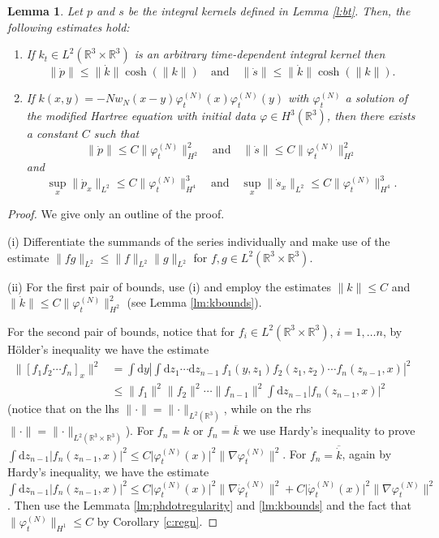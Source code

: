 \documentclass[11pt,a4paper,draft,DIV11]{scrartcl}	%
\newtheorem{lem}[thm]{Lemma}
\newcommand{\di}{\textrm{d}}		%
\newcommand{\cc}[1]{\overline{#1}}	%
\newcommand{\Rbb}{\mathbb{R}}		%
\newcommand{\norm}[1]{\lVert#1\rVert}	%
\newcommand{\ph}{\varphi_t^{(N)}}	%
\newcommand{\phdot}{\dot{\varphi}_t^{(N)}}	%
\newcommand{\bd}{\begin{displaymath}}			%
\newcommand{\ed}{\end{displaymath}}
\begin{document}
\begin{lem}
\label{lem:dottedests1}
Let $p$ and $s$ be the integral kernels defined in Lemma \ref{l:bt}. Then, the following estimates hold:
\begin{enumerate}
\item If $k_t \in L^2(\Rbb^3\times\Rbb^3)$ is an arbitrary time-dependent integral kernel then
\bd
\norm{\dot p} \leq \norm{\dot k} \cosh(\norm{k}) \quad \mbox{and} \quad \norm{\dot s} \leq \norm{\dot k} \cosh(\norm{k}).
\ed
\item If $k(x,y) = - N w_N(x-y) \ph(x) \ph(y)$ with $\ph$ a solution of the modified Hartree equation with initial data $\varphi \in H^3(\Rbb^3)$, then there exists a constant $C$ such that
\bd
\norm{\dot p} \leq C \norm{\ph}_{H^2}^2 \quad \mbox{and} \quad \norm{\dot s} \leq C \norm{\ph}_{H^2}^2
\ed
and
\bd
\sup_x \norm{\dot p_x}_{L^2} \leq C \norm{\ph}_{H^4}^3 \quad \mbox{and} \quad \sup_x \norm{\dot s_x}_{L^2} \leq C \norm{\ph}_{H^4}^3.
\ed
\end{enumerate}
\end{lem}
\begin{proof}
We give only an outline of the proof.

(i) Differentiate the summands of the series individually and make use of the estimate $\norm{fg}_{L^2} \leq \norm{f}_{L^2} \norm{g}_{L^2}$ for $f,g \in L^2(\Rbb^3\times \Rbb^3)$.

(ii) For the first pair of bounds, use (i) and employ the estimates $\norm{k} \leq C$ and $\norm{\dot k} \leq C \norm{\ph}_{H^2}^2$ (see Lemma \ref{lm:kbounds}).

For the second pair of bounds, notice that for $f_i \in L^2(\Rbb^3 \times \Rbb^3)$, $i=1,\dots n$, by H\"older's inequality we have the estimate
\begin{align*}
\norm{\left[ f_1 f_2 \cdots f_n\right]_x}^2 & = \int \di y \left\lvert \int \di z_1 \cdots \di z_{n-1}\ f_1(y,z_1) f_2(z_1,z_2) \cdots f_n(z_{n-1},x) \right\rvert^2 \\
& \leq \norm{f_1}^2 \norm{f_2}^2 \cdots \norm{f_{n-1}}^2 \int \di z_{n-1} \lvert f_n(z_{n-1},x) \rvert^2 
\end{align*}
(notice that on the lhs $\norm{\cdot}= \norm{\cdot}_{L^2(\Rbb^3)}$, while on the rhs $\norm{\cdot} = \norm{\cdot}_{L^2(\Rbb^3\times\Rbb^3)}$).
For $f_n = k$ or $f_n = \cc{k}$ we use Hardy's inequality to prove $\int \di z_{n-1} \lvert f_n(z_{n-1},x) \rvert^2 \leq C \lvert \ph(x) \rvert^2 \norm{\nabla \ph}^2$. For $f_n = \cc{\dot k}$, again by Hardy's inequality, we have the estimate $\int \di z_{n-1} \lvert f_n(z_{n-1},x) \rvert^2 \leq C\lvert \ph(x)\rvert^2 \norm{\nabla \phdot}^2 + C \lvert \phdot(x)\rvert^2 \norm{\nabla \ph}^2$. Then use the Lemmata \ref{lm:phdotregularity} and \ref{lm:kbounds} and the fact that $\norm{\ph}_{H^1} \leq C$ by Corollary \ref{c:regn}.
\end{proof}
\end{document}
